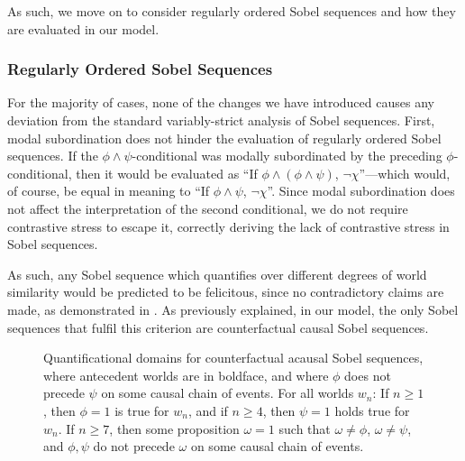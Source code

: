 \noindent As such, we move on to consider regularly ordered Sobel sequences and how they are evaluated in our model.

\subsubsection{Regularly Ordered Sobel Sequences}
For the majority of cases, none of the changes we have introduced causes any deviation from the standard variably-strict analysis of Sobel sequences. 
First, modal subordination does not hinder the evaluation of regularly ordered Sobel sequences. If the $\phi\land\psi$-conditional was modally subordinated by the preceding $\phi$-conditional, then it would be evaluated as \enquote{If $\phi\land(\phi\land\psi)$, $\neg\chi$}---which would, of course, be equal in meaning to \enquote{If $\phi\land\psi$, $\neg\chi$}. Since modal subordination does not affect the interpretation of the second conditional, we do not require contrastive stress to escape it, correctly deriving the lack of contrastive stress in Sobel sequences.

As such, any Sobel sequence which quantifies over different degrees of world similarity would be predicted to be felicitous, since no contradictory claims are made, as demonstrated in . As previously explained, in our model, the only Sobel sequences that fulfil this criterion are counterfactual causal Sobel sequences.
\begin{figure}[ht]

\caption{Quantificational domains for counterfactual acausal Sobel sequences, where antecedent worlds are in boldface, and where $\phi$ does not precede $\psi$ on some causal chain of events. For all worlds $w_n$: If $n\geqslant1$, then $\phi=1$ is true for $w_n$, and if $n\geqslant 4$, then $\psi=1$ holds true for $w_n$. If $n\geqslant 7$, then some proposition $\omega=1$ such that $\omega\neq\phi$, $\omega\neq\psi$, and $\phi,\psi$ do not precede $\omega$ on some causal chain of events.}
\end{figure}

